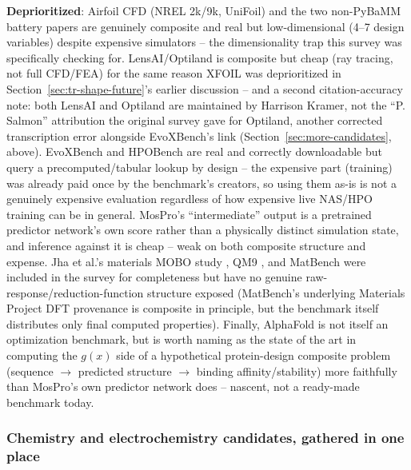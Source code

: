\documentclass[11pt]{article}
\begin{document}
\textbf{Deprioritized}: Airfoil CFD (NREL 2k/9k, UniFoil) and the two
non-PyBaMM battery papers \citep{kench2024battery,ma2024battery} are
genuinely composite and real but low-dimensional (4--7 design variables)
despite expensive simulators -- the dimensionality trap this survey was
specifically checking for. LensAI/Optiland
\citep{kramer2024lensai,kramer2024optiland} is composite but cheap (ray
tracing, not full CFD/FEA) for the same reason XFOIL was deprioritized in
Section~\ref{sec:tr-shape-future}'s earlier discussion -- and a second
citation-accuracy note: both LensAI and Optiland are maintained by
Harrison Kramer, not the ``P. Salmon'' attribution the original survey
gave for Optiland, another corrected transcription error alongside
EvoXBench's link (Section~\ref{sec:more-candidates}, above). EvoXBench
and HPOBench are real and correctly downloadable but query a
precomputed/tabular lookup by design -- the expensive part (training) was
already paid once by the benchmark's creators, so using them as-is is not
a genuinely expensive evaluation regardless of how expensive live NAS/HPO
training can be in general. MosPro's ``intermediate'' output is a
pretrained predictor network's own score rather than a physically
distinct simulation state, and inference against it is cheap -- weak on
both composite structure and expense. Jha et al.'s materials MOBO study
\citep{jha2018materials}, QM9 \citep{ramakrishnan2014qm9}, and MatBench
\citep{dunn2020matbench} were included in the survey for completeness but
have no genuine raw-response/reduction-function structure exposed
(MatBench's underlying Materials Project DFT provenance
\citep{jain2013materialsproject} is composite in principle, but the
benchmark itself distributes only final computed properties). Finally,
AlphaFold \citep{jumper2021alphafold} is not itself an optimization
benchmark, but is worth naming as the state of the art in computing the
$g(x)$ side of a hypothetical protein-design composite problem (sequence
$\to$ predicted structure $\to$ binding affinity/stability) more
faithfully than MosPro's own predictor network does -- nascent, not a
ready-made benchmark today.

\subsubsection{Chemistry and electrochemistry candidates, gathered in one place}
\label{sec:chemistry-candidates}
\end{document}

